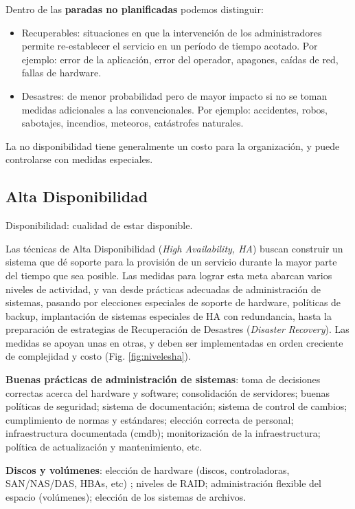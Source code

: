 Dentro de las {\bf paradas no planificadas} podemos distinguir:
	\begin{itemize}		
		\item Recuperables: situaciones en que la intervención de los 
administradores permite re-establecer el servicio en un período de tiempo acotado. Por ejemplo: error de la aplicación, error del operador, apagones, caídas de red, fallas de hardware. 
		\item Desastres: de menor probabilidad pero de mayor impacto si 
no se toman medidas adicionales a las convencionales. Por ejemplo: accidentes, robos, sabotajes, incendios, meteoros, catástrofes naturales. 

	\end{itemize}
	La no disponibilidad tiene generalmente un costo para la organización, y puede controlarse con medidas especiales.

\subsection{Alta Disponibilidad}

Disponibilidad: cualidad de estar disponible. 

Las técnicas de Alta Disponibilidad (\textit{High Availability, HA}) buscan construir un sistema que dé soporte para la provisión de un servicio durante la mayor parte del tiempo que sea posible. Las medidas para lograr esta meta abarcan varios niveles de actividad, y van desde prácticas adecuadas de administración de sistemas, pasando por elecciones especiales de soporte de hardware, políticas de backup, implantación de sistemas especiales de HA con redundancia, hasta la preparación de estrategias de Recuperación de Desastres (\textit{Disaster Recovery}). Las medidas se apoyan unas en otras, y deben ser implementadas en orden creciente de complejidad y costo (Fig. \ref{fig:nivelesha}). 


{\bf Buenas prácticas de administración de sistemas}: toma de decisiones correctas acerca del hardware y software; consolidación de servidores; buenas políticas de  seguridad; sistema de documentación; sistema de control de cambios; cumplimiento de normas y estándares; elección correcta de personal; infraestructura documentada (cmdb); monitorización de la infraestructura; política de actualización y mantenimiento, etc. 

{\bf Discos y volúmenes}: elección de hardware (discos, controladoras, SAN/NAS/DAS, HBAs, etc) ; niveles de RAID; administración flexible del espacio (volúmenes); elección de los sistemas de archivos. 


